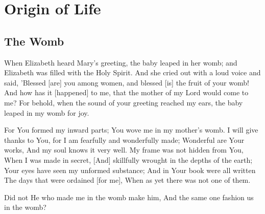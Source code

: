 \chapter{Origin of Life}
\section{The Womb}

\begin{scripture}[Luke 1:41-44]
    When Elizabeth heard Mary's greeting, the baby leaped in her womb; and Elizabeth was filled with the Holy Spirit.    
        And she cried out with a loud voice and said, 'Blessed [are] you among women, and blessed [is] the fruit of your womb!
        And how has it [happened] to me, that the mother of my Lord would come to me?
        For behold, when the sound of your greeting reached my ears, the baby leaped in my womb for joy.
 \end{scripture}

\vspace{1\baselineskip}


\begin{scripture}[Psalm 139:13-16]
    For You formed my inward parts; You wove me in my mother's womb.  
    I will give thanks to You, for I am fearfully and wonderfully made; Wonderful are Your works, And my soul knows it very well.  
    My frame was not hidden from You, When I was made in secret, [And] skillfully wrought in the depths of the earth;  
    Your eyes have seen my unformed substance; And in Your book were all written The days that were ordained [for me], When as yet there was not one of them.  
\end{scripture}

\vspace{2\baselineskip}

\begin{scripture}[Job 31:15]
    Did not He who made me in the womb make him, And the same one fashion us in the womb?
\end{scripture}

